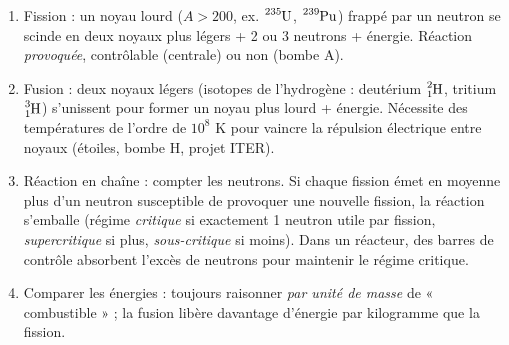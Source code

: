 \documentclass[11pt]{article}
\newcommand{\cle}[1]{{\popxbold\color{popdark}#1}}
\begin{document}
\begin{methode}
\begin{enumerate}
\item \cle{Fission} : un noyau lourd ($A > 200$, ex. $\ce{^{235}U}$, $\ce{^{239}Pu}$) frappé par un neutron se scinde en deux noyaux plus légers + 2 ou 3 neutrons + énergie. Réaction \emph{provoquée}, contrôlable (centrale) ou non (bombe A).
\item \cle{Fusion} : deux noyaux légers (isotopes de l'hydrogène : deutérium $\ce{^{2}_{1}H}$, tritium $\ce{^{3}_{1}H}$) s'unissent pour former un noyau plus lourd + énergie. Nécessite des températures de l'ordre de $10^{8}$ K pour vaincre la répulsion électrique entre noyaux (étoiles, bombe H, projet ITER).
\item \cle{Réaction en chaîne} : compter les neutrons. Si chaque fission émet en moyenne plus d'un neutron susceptible de provoquer une nouvelle fission, la réaction s'emballe (régime \emph{critique} si exactement 1 neutron utile par fission, \emph{supercritique} si plus, \emph{sous-critique} si moins). Dans un réacteur, des barres de contrôle absorbent l'excès de neutrons pour maintenir le régime critique.
\item \cle{Comparer les énergies} : toujours raisonner \emph{par unité de masse} de « combustible » ; la fusion libère davantage d'énergie par kilogramme que la fission.
\end{enumerate}
\end{methode}
\end{document}
